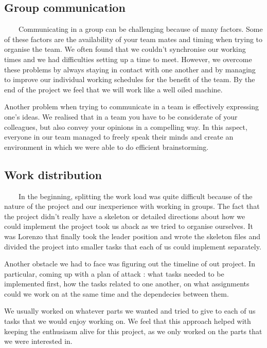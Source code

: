 \documentclass{article}
\begin{document}
\subsection{Group communication}

\ \ \ \ Communicating in a group can be challenging because of many factors.
Some of these factors are the availability of your team mates and timing when
trying to organise the team. We often found that we couldn't synchronise our
working times and we had difficulties setting up a time to meet. However, we
overcome these problems by always staying in contact with one another and by
managing to improve our individual working schedules for the benefit of the
team. By the end of the project we feel that we will work like a well oiled
machine.

Another problem when trying to communicate in a team is effectively expressing
one's ideas. We realised that in a team you have to be considerate of your
colleagues, but also convey your opinions in a compelling way. In this aspect,
everyone in our team managed to freely speak their minds and create an
environment in which we were able to do efficient brainstorming.

\subsection{Work distribution}

\ \ \ \ In the beginning, splitting the work load was quite difficult because
of the nature of the project and our inexperience with working in groups. The
fact that the project didn't really have a skeleton or detailed directions
about how we could implement the project took us aback as we tried to organise
ourselves. It was Lorenzo that finally took the leader position and wrote the
skeleton files and divided the project into smaller tasks that each of us
could implement separately.

Another obstacle we had to face was figuring out the timeline of out project.
In particular, coming up with a plan of attack : what tasks needed to be
implemented first, how the tasks related to one another, on what assignments
could we work on at the same time and the dependecies between them.

We usually worked on whatever parts we wanted and tried to give to each of us
tasks that we would enjoy working on. We feel that this approach helped with
keeping the enthusiasm alive for this project, as we only worked on the parts
that we were interested in.
\end{document}
